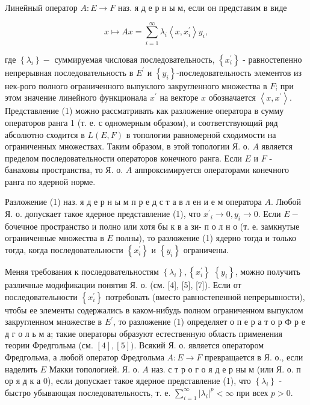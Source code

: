 \documentclass[10pt]{article}
\begin{document}
Линейный оператор $A: E \rightarrow F$ наз. я д е р н ы м, если он представим в виде



\[

x \mapsto A x=\sum_{i=1}^{\infty} \lambda_{i}\left\langle x, x_{i}^{\prime}\right\rangle y_{i},

\]



где $\left\{\lambda_{i}\right\}-$ суммируемая числовая последовательность, $\left\{x_{i}^{\prime}\right\}$ - равностепенно непрерывная последовательность в $E^{\prime}$ и $\left\{y_{i}\right\}$-последовательность элементов из нек-рого полного ограниченного выпуклого закругленного множества в $F$; при этом значение линейного функционала $x^{\prime}$ на векторе $x$ обозначается $\left\langle x, x^{\prime}\right\rangle$. Представление (1) можно рассматривать как разложение оператора в сумму операторов ранга 1 (т. е. с одномерным образом), и соответствующий ряд абсолютно сходится в $L(E, F)$ в топологии равномерной сходимости на ограниченных множествах. Таким образом, в этой топологии Я. о. $A$ является пределом последовательности операторов конечного ранга. Если $E$ и $F$ - банаховы пространства, то Я. о. $A$ аппроксимируется операторами конечного ранга по ядерной норме.



Разложение (1) наз. я д е р н ы м п р е д с т а в л ен и е м оператора $A$. Любой Я. о. допускает такое ядерное представление (1), что $x^{\prime}{ }_{i} \rightarrow 0, y_{i} \rightarrow 0$. Если $E-$ бочечное пространство и полно или хотя бы к в а зи- п о л н о (т. е. замкнутые ограниченные множества в $E$ полны), то разложение (1) ядерно тогда и только тогда, когда последовательности $\left\{x_{i}^{\prime}\right\}$ и $\left\{y_{i}\right\}$ ограничены.



Меняя требования к последовательностям $\left\{\lambda_{i}\right\},\left\{x_{i}^{\prime}\right\}$ $\left\{y_{i}\right\}$, можно получить различные модификации понятия Я. о. (см. [4], [5], [7]). Если от последовательности $\left\{x_{i}^{\prime}\right\}$ потребовать (вместо равностепенной непрерывности), чтобы ее элементы содержались в каком-нибудь полном ограниченном выпуклом закругленном множестве в $E^{\prime}$, то разложение (1) определяет о п е р а т о р Ф р е д г о л ь м а; такие операторы образуют естественную область применения теории Фредгольма (см. $[4],[5])$. Всякий Я. о. является оператором Фредгольма, а любой оператор Фредгольма $A: E \rightarrow F$ превращается в Я. о., если наделить $E$ Макки топологией. Я. о. $A$ наз. с т р о г о я д е р ны м (или Я. о. п ор я д к а 0), если допускает такое ядерное представление (1), что $\left\{\lambda_{i}\right\}$ - быстро убывающая последовательность, т. е. $\sum_{i=1}^{\infty}\left|\lambda_{i}\right|^{p}<\infty$ при всех $p>0$.
\end{document}

